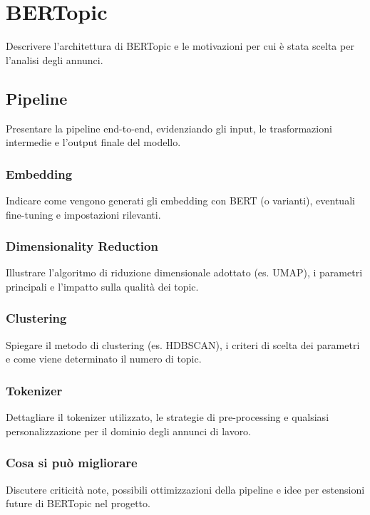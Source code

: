 \chapter{BERTopic}
Descrivere l'architettura di BERTopic e le motivazioni per cui è stata scelta per l'analisi degli annunci.

\section{Pipeline}
Presentare la pipeline end-to-end, evidenziando gli input, le trasformazioni intermedie e l'output finale del modello.

\subsection{Embedding}
Indicare come vengono generati gli embedding con BERT (o varianti), eventuali fine-tuning e impostazioni rilevanti.

\subsection{Dimensionality Reduction}
Illustrare l'algoritmo di riduzione dimensionale adottato (es. UMAP), i parametri principali e l'impatto sulla qualità dei topic.

\subsection{Clustering}
Spiegare il metodo di clustering (es. HDBSCAN), i criteri di scelta dei parametri e come viene determinato il numero di topic.

\subsection{Tokenizer}
Dettagliare il tokenizer utilizzato, le strategie di pre-processing e qualsiasi personalizzazione per il dominio degli annunci di lavoro.

\subsection{Cosa si può migliorare}
Discutere criticità note, possibili ottimizzazioni della pipeline e idee per estensioni future di BERTopic nel progetto.
